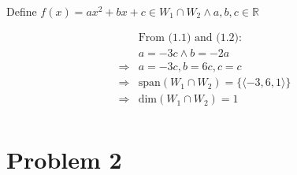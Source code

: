 \documentclass{article}
\def\R{\mathbb{R}}
\begin{document}
~

Define $f(x)=ax^2+bx+c \in W_1\cap W_2\land a,b,c\in \R$

\begin{equation}
\tag{1.3}
\begin{split}
&\text{From (1.1) and (1.2):}\\
&a=-3c \land b=-2a\\
\Rightarrow & a=-3c, b=6c,c=c\\
\Rightarrow & \text{span}(W_1\cap W_2)=\{\langle-3,6,1\rangle\}\\
\Rightarrow & \text{dim}(W_1\cap W_2) =1\\
\end{split}
\end{equation}

\newpage

\section{Problem 2}

~
\end{document}
